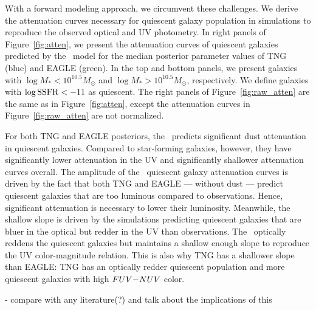 With a forward modeling approach, we circumvent these challenges. We derive the 
attenuation curves necessary for quiescent galaxy population in simulations to
reproduce the observed optical and UV photometry.  In right panels of
Figure~\ref{fig:atten}, we present the attenuation curves of quiescent galaxies 
predicted by the \eda~model for the median posterior parameter values of TNG (blue) 
and EAGLE (green). In the top and bottom panels, we present galaxies with 
$\log M_* < 10^{10.5} M_\odot$ and $\log M_* > 10^{10.5} M_\odot$, respectively. 
We define galaxies with $\log {\rm SSFR} < -11$ as quiescent. The right panels 
of Figure~\ref{fig:raw_atten} are the same as in Figure~\ref{fig:atten}, except
the attenuation curves in Figure~\ref{fig:raw_atten} are not normalized. 

For both TNG and EAGLE posteriors, the \eda~predicts significant dust attenuation 
in quiescent galaxies. Compared to star-forming galaxies, however, they have 
significantly lower attenuation in the UV and significantly shallower
attenuation curves overall. The amplitude of the \eda~quiescent galaxy attenuation
curves is driven by the fact that both TNG and EAGLE --- without dust --- predict
quiescent galaxies that are too luminous compared to observations. Hence, 
significant attenuation is necessary to lower their luminosity. Meanwhile, the 
shallow slope is driven by the simulations predicting quiescent galaxies that 
are bluer in the optical but redder in the UV than observations. The \eda~optically 
reddens the quiescent galaxies but maintains a shallow enough slope to reproduce 
the UV color-magnitude relation. This is also why TNG has a shallower slope
than EAGLE: TNG has an optically redder quiescent population and more quiescent
galaxies with high $FUV{-}NUV$ color. 

- compare with any literature(?) and talk about the implications of this
